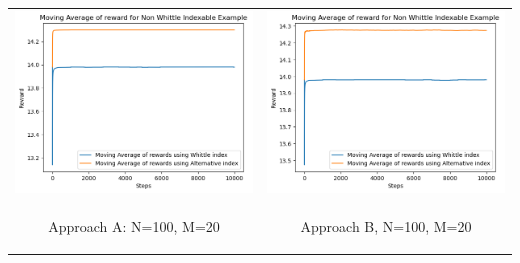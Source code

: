 \documentclass{slides}
\begin{document}
{{\newpage
\begin{center}
\begin{tabular}{cc}
\includegraphics[scale=0.6]{non_whittle_comparison_A.png} &
\includegraphics[scale=0.6]{BTP_non_whittle_indexable_B.png} \\
\begin{small}
 Approach A: N=100, M=20\end{small} & \begin{small}Approach B, N=100, M=20\end{small}\\

\end{tabular}
\end{center}}}
\end{document}
